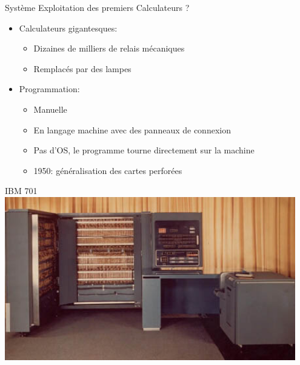 \documentclass[11pt]{beamer}
\begin{document}
\begin{frame}{Système Exploitation des premiers Calculateurs ?}

\begin{itemize}
\itemsep1pt\parskip0pt
\item
  Calculateurs gigantesques:

  \begin{itemize}
  \itemsep1pt\parskip0pt
  \item
    Dizaines de milliers de relais mécaniques
  \item
    Remplacés par des lampes
  \end{itemize}
\item
  Programmation:
  \begin{itemize}
  \item
    Manuelle
  \item
    En langage machine avec des panneaux de connexion
  \item
    Pas d'OS, le programme tourne directement sur la machine
  \item
    1950: généralisation des cartes perforées
  \end{itemize}
\end{itemize}
\end{frame}

\begin{frame}{IBM 701}
  \centering
  \includegraphics[width=0.95\textwidth]{figs/ibm701.png}
\end{frame}
\end{document}
